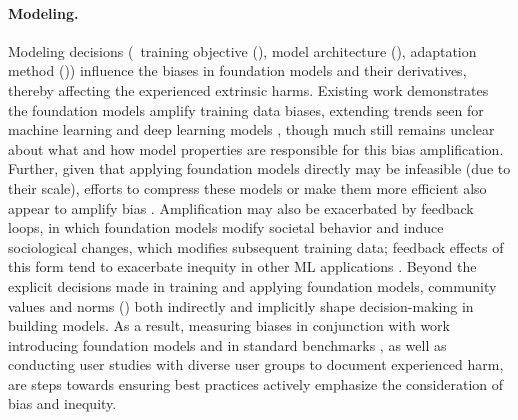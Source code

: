 \paragraph{Modeling.} 
Modeling decisions (\eg~training objective (), model architecture (), adaptation method ())  influence the biases in foundation models and their derivatives, thereby affecting the experienced extrinsic harms.  
Existing work demonstrates the foundation models amplify training data biases, extending trends seen for machine learning and deep learning models \citep{zhao-etal-2017-men,wang2019balanced,jia-etal-2020-mitigating,hashimoto2018fairness}, though much still remains unclear about what and how model properties are responsible for this bias amplification.
Further, given that applying foundation models directly may be infeasible (due to their scale), efforts to compress these models or make them more efficient also appear to amplify bias \citep{hooker2020, renduchintala2021}.
Amplification may also be exacerbated by feedback loops, in which foundation models modify societal behavior and induce sociological changes, which modifies subsequent training data; feedback effects of this form tend to exacerbate inequity in other  ML applications \cite{lum2016predict,ensign2018runaway,hashimoto2018fairness}.
Beyond the explicit decisions made in training and applying foundation models, community values \citep{birhane2020} and norms () both indirectly and implicitly \citep{liu2021} shape decision-making in building models.
As a result, measuring biases in conjunction with work introducing foundation models \citep[\eg][]{brown2020gpt3} and in standard benchmarks \citep[][]{friedman1996}, as well as conducting user studies with diverse user groups to document experienced harm, are steps towards ensuring best practices actively emphasize the consideration of bias and inequity.
